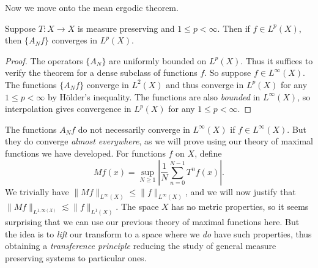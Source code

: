 Now we move onto the mean ergodic theorem.

\begin{theorem}
    Suppose $T: X \to X$ is measure preserving and $1 \leq p < \infty$. Then if $f \in L^p(X)$, then $\{ A_N f \}$ converges in $L^p(X)$.
\end{theorem}
\begin{proof}
    The operators $\{ A_N \}$ are uniformly bounded on $L^p(X)$. Thus it suffices to verify the theorem for a dense subclass of functions $f$. So suppose $f \in L^\infty(X)$. The functions $\{ A_N f \}$ converge in $L^2(X)$ and thus converge in $L^p(X)$ for any $1 \leq p < \infty$ by H\"{o}lder's inequality. The functions are also \emph{bounded} in $L^\infty(X)$, so interpolation gives convergence in $L^p(X)$ for any $1 \leq p < \infty$.
\end{proof}

The functions $A_N f$ do not necessarily converge in $L^\infty(X)$ if $f \in L^\infty(X)$. But they do converge \emph{almost everywhere}, as we will prove using our theory of maximal functions we have developed. For functions $f$ on $X$, define
%
\[ Mf(x) = \sup_{N \geq 1} \left| \frac{1}{N} \sum_{n = 0}^{N-1} T^n f(x) \right|. \]
%
We trivially have $\| Mf \|_{L^\infty(X)} \leq \| f \|_{L^\infty(X)}$, and we will now justify that $\| Mf \|_{L^{1,\infty(X)}} \lesssim \| f \|_{L^1(X)}$. The space $X$ has no metric properties, so it seems surprising that we can use our previous theory of maximal functions here. But the idea is to \emph{lift} our transform to a space where we \emph{do} have such properties, thus obtaining a \emph{transference principle} reducing the study of general measure preserving systems to particular ones.

%
%

